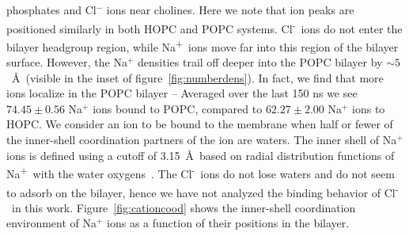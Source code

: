 \documentclass[12pt,preprint,times,openany,draft]{book}
\newcommand{\na}{Na\textsuperscript{+}~}
\newcommand{\cl}{Cl\textsuperscript{-}~}
\begin{document}
phosphates and Cl$^-$ ions near cholines. Here we note that ion peaks are positioned similarly in both HOPC and 
POPC systems. \cl ions do not enter the bilayer headgroup region, while \na ions move far into this region
of the bilayer surface. However, the Na$^+$ densities trail off deeper into the POPC bilayer by 
$\sim5$~\AA~(visible in the inset of figure~\ref{fig:numberdens}). 
In fact, we find that more ions localize in the POPC bilayer -- Averaged over the last 150 ns we see
$74.45 \pm 0.56$ Na$^+$  
ions bound to POPC, 
compared to $62.27\pm 2.00$ Na$^+$ 
ions to HOPC.
We consider an ion to be bound to the membrane when half or fewer of the inner-shell coordination partners of the ion are waters. The 
inner shell of Na$^+$ ions is defined using a cutoff of 3.15~\AA~based on
radial distribution functions of \na with the water oxygens~\cite{varma:2008:JACS}.
The \cl ions do not lose waters and do not seem to adsorb on the bilayer, hence we have not analyzed
the binding behavior of \cl in this work.
Figure~\ref{fig:cationcood} shows the inner-shell coordination environment of Na$^+$ ions as a 
function of their positions in the bilayer. 
\end{document}
